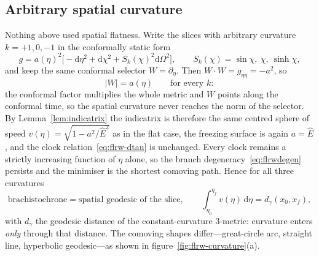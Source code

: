 \documentclass[12pt]{iopart}
\newcommand{\Ehat}{\hat E}
\newcommand{\dd}{\mathrm{d}}
\theoremstyle{plain}
\theoremstyle{definition}
\theoremstyle{plain}
\theoremstyle{remark}
\begin{document}
\subsection{Arbitrary spatial curvature}
\label{sec:flrw-curvature}
Nothing above used spatial flatness. Write the slices with arbitrary curvature
$k=+1,0,-1$ in the conformally static form
\begin{equation}
   g=a(\eta)^2\Big[-\dd\eta^2+\dd\chi^2+S_k(\chi)^2\dd\Omega^2\Big],
   \qquad S_k(\chi)=\sin\chi,\ \chi,\ \sinh\chi ,
   \label{eq:flrw-k}
\end{equation}
and keep the same conformal selector $W=\partial_\eta$. Then $W\cdot W=g_{\eta\eta}=-a^2$,
so
\begin{equation}
   |W|=a(\eta)\qquad\text{for every }k :
   \label{eq:Wnorm-k}
\end{equation}
the conformal factor multiplies the whole metric and $W$ points along the conformal time,
so the spatial curvature never reaches the norm of the selector. By
Lemma~\ref{lem:indicatrix} the indicatrix is therefore the same centred sphere of speed
$v(\eta)=\sqrt{1-a^2/\Ehat^2}$ as in the flat case, the freezing surface is again
$a=\Ehat$, and the clock relation~\eqref{eq:flrw-dtau} is unchanged. Every clock remains a
strictly increasing function of $\eta$ alone, so the branch degeneracy~\eqref{eq:flrwdegen}
persists and the minimiser is the shortest comoving path. Hence for all three curvatures
\begin{equation}
   \text{brachistochrone}=\text{spatial geodesic of the slice},
   \qquad
   \int_{\eta_0}^{\eta_f}v(\eta)\,\dd\eta=d_\gamma(x_0,x_f),
   \label{eq:flrw-geodesic}
\end{equation}
with $d_\gamma$ the geodesic distance of the constant-curvature $3$-metric: curvature
enters \emph{only} through that distance. The comoving shapes differ---great-circle arc,
straight line, hyperbolic geodesic---as shown in
figure~\ref{fig:flrw-curvature}(a).
\end{document}
